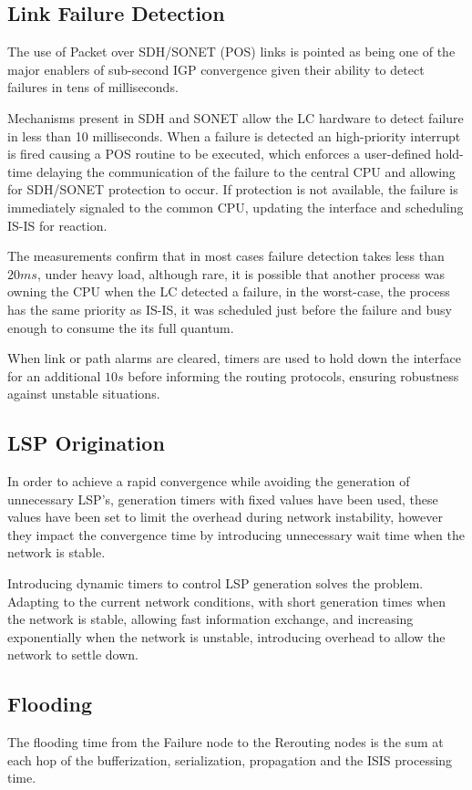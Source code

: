 \documentclass[a4paper, 11pt]{article}
\begin{document}
\subsection{Link Failure Detection}
The use of Packet over SDH/SONET (POS) links is pointed as being one of the major enablers of sub-second IGP convergence given their ability to detect failures in tens of milliseconds.

Mechanisms present in SDH and SONET allow the LC hardware to detect failure in less than 10 milliseconds.
When a failure is detected an high-priority interrupt is fired causing a POS routine to be executed,
which enforces a user-defined hold-time delaying the communication of the failure to the central CPU and allowing for SDH/SONET protection to occur.
If protection is not available, the failure is immediately signaled to the common CPU, updating the interface and scheduling IS-IS for reaction.

The measurements confirm that in most cases failure detection takes less than $20ms$, under heavy load, 
although rare, it is possible that another process was owning the CPU when the LC detected a failure,
in the worst-case, the process has the same priority as IS-IS, 
it was scheduled just before the failure and busy enough to consume the its full quantum.

When link or path alarms are cleared, 
timers are used to hold down the interface for an additional $10s$ before informing the routing protocols, 
ensuring robustness against unstable situations.

\subsection{LSP Origination}
In order to achieve a rapid convergence while avoiding the generation of unnecessary LSP's, generation timers with fixed values have been used,
these values have been set to limit the overhead during network instability, 
however they impact the convergence time by introducing unnecessary wait time when the network is stable.

Introducing dynamic timers to control LSP generation solves the problem.
Adapting to the current network conditions, 
with short generation times when the network is stable, allowing fast information exchange,
and increasing exponentially when the network is unstable,
introducing overhead to allow the network to settle down.

\subsection{Flooding}
The flooding time from the Failure node to the Rerouting nodes is the sum at each hop of the bufferization, serialization, propagation and the ISIS processing time.
\end{document}
